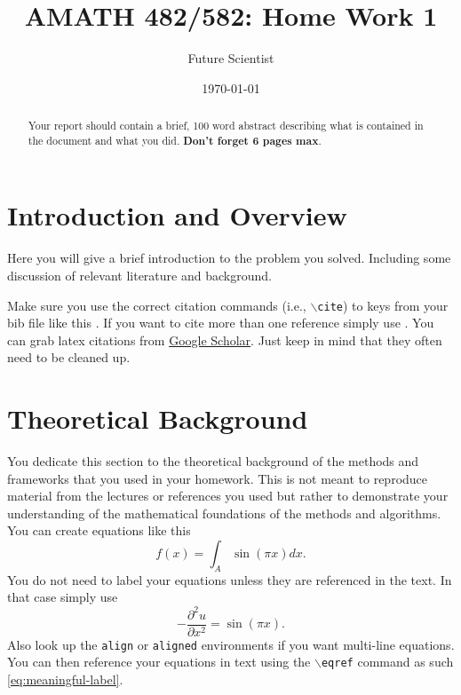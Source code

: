 \documentclass[11pt]{amsart}
\title{AMATH 482/582: Home Work 1}
\author{Future Scientist} %
\date{\today} %
\begin{document}
\maketitle 

\begin{abstract}
    Your report should contain a brief, 100 word abstract describing what is contained in 
    the document and what you did. {\bf Don't forget 6 pages max}.
\end{abstract}


\section{Introduction and Overview}\label{sec:Introduction}

Here you will give a brief introduction to the problem you solved. Including 
some discussion of relevant literature and background. 

Make sure you use the correct citation commands (i.e., \texttt{$\backslash$cite}) to keys 
from your bib file like this \cite{example-article-citation}. If you want 
to cite more than one reference simply use \cite{example-article-citation, example-book-citation}. You can grab latex citations 
from \href{https://scholar.google.com}{Google Scholar}. Just keep in mind that they often 
need to be cleaned up.

\section{Theoretical Background}\label{sec:theory}

You dedicate this section to the theoretical background of the methods and frameworks 
that you used in your homework. This is not meant to reproduce material from the lectures
 or references you used but rather to demonstrate your understanding of the 
 mathematical foundations of the methods and algorithms. You can create equations like this 
 \begin{equation*}
     f(x) = \int_A \sin( \pi x) dx.
 \end{equation*}
 You do not need to label your equations unless they are referenced in the text. In that 
 case simply use 
 \begin{equation}\label{eq:meaningful-label}
      - \frac{\partial^2 u}{\partial x^2} = \sin ( \pi x).
 \end{equation}
Also look up the \texttt{align} or \texttt{aligned} environments if you want multi-line 
equations. You can then reference your equations in text using the $\backslash$\texttt{eqref}
command as such \eqref{eq:meaningful-label}. 
\end{document}
